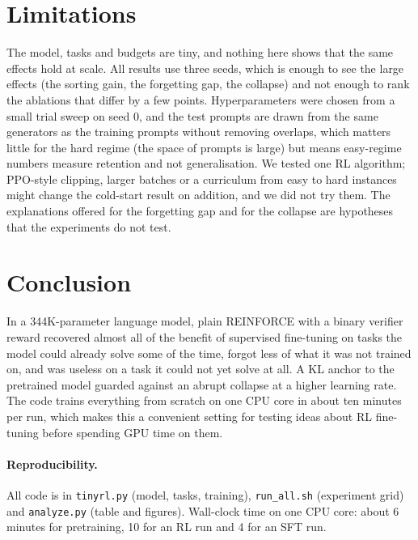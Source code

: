 \documentclass[10pt,twocolumn]{article}
\begin{document}
\section{Limitations}
The model, tasks and budgets are tiny, and nothing here shows that the same effects hold at scale.
All results use three seeds, which is enough to see the large effects (the sorting gain, the
forgetting gap, the collapse) and not enough to rank the ablations that differ by a few points.
Hyperparameters were chosen from a small trial sweep on seed 0, and the test prompts are drawn from
the same generators as the training prompts without removing overlaps, which matters little for the
hard regime (the space of prompts is large) but means easy-regime numbers measure retention and not
generalisation. We tested one RL algorithm; PPO-style clipping, larger batches or a curriculum from
easy to hard instances might change the cold-start result on addition, and we did not try them. The
explanations offered for the forgetting gap and for the collapse are hypotheses that the experiments
do not test.

\section{Conclusion}
In a 344K-parameter language model, plain REINFORCE with a binary verifier reward recovered almost
all of the benefit of supervised fine-tuning on tasks the model could already solve some of the
time, forgot less of what it was not trained on, and was useless on a task it could not yet solve at
all. A KL anchor to the pretrained model guarded against an abrupt collapse at a higher learning
rate. The code trains everything from scratch on one CPU core in about ten minutes per run, which
makes this a convenient setting for testing ideas about RL fine-tuning before spending GPU time on
them.

\paragraph{Reproducibility.} All code is in \texttt{tinyrl.py} (model, tasks, training),
\texttt{run\_all.sh} (experiment grid) and \texttt{analyze.py} (table and figures). Wall-clock time
on one CPU core: about 6 minutes for pretraining, 10 for an RL run and 4 for an SFT run.
\end{document}
